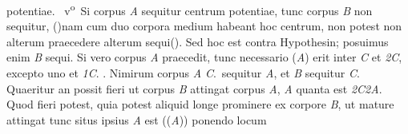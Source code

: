 potentiae.
\pend
%
\pstart
{}~v\textsuperscript{o}\rbrack\ Si%
%
corpus \textit{A} sequitur centrum potentiae,\protect{} tunc corpus \textit{B} non sequitur, (\protect\vphantom)nam cum
%
duo
corpora medium habeant hoc centrum,
non potest non alterum praecedere alterum sequi\protect\vphantom(). Sed hoc est contra Hypothesin; posuimus enim \textit{B} sequi. Si vero 
corpus \textit{A} praecedit, tunc necessario (\textit{A}) erit inter \textit{C} et \textit{{\scriptsize2}C}, excepto uno
%
%
et \textit{{\scriptsize1}C}. 
%
.
%
Nimirum corpus \textit{A} 
\textit{C}.\ sequitur \textit{A}, et \textit{B} sequitur \textit{C}. 
%
Quaeritur an possit fieri ut
corpus \textit{B} attingat corpus \textit{A},
%
%
\textit{A} 
%
%
quanta est \textit{{\scriptsize2}C{\scriptsize2}A}. 
%
Quod fieri potest, quia potest aliquid longe prominere ex corpore \textit{B}, ut mature attingat 
tunc situs ipsius \textit{A} est ((\textit{A})) ponendo locum 
%
%
